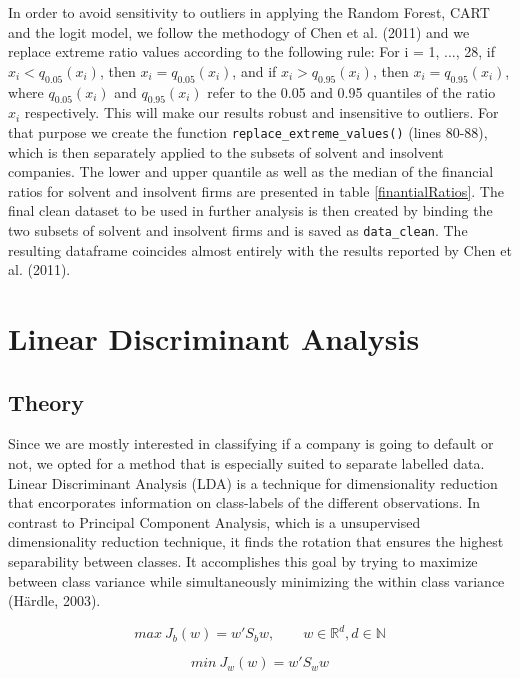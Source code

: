 \documentclass{article}
\begin{document}
 In order to avoid sensitivity to outliers in applying the Random Forest, CART and the logit model, we follow the methodogy of Chen et al. (2011) and we replace extreme ratio values according to the following rule: For i = 1, ..., 28, if $x_i<q_{0.05}(x_i)$, then $x_i=q_{0.05}(x_i)$, and if $x_i>q_{0.95}(x_i)$, then $x_i=q_{0.95}(x_i)$, where $q_{0.05}(x_i)$ and $q_{0.95}(x_i)$ refer to the 0.05 and 0.95 quantiles of the ratio $x_i$ respectively. This will make our results robust and insensitive to outliers. For that purpose we create the function \texttt{replace\_extreme\_values()} (lines 80-88), which is then separately applied to the subsets of solvent and insolvent companies. The lower and upper quantile as well as the median of the financial ratios for solvent and insolvent firms are presented in table \ref{finantialRatios}. The final clean dataset to be used in further analysis is then created by binding the two subsets of solvent and insolvent firms and is saved as \texttt{data\_clean}. The resulting dataframe coincides almost entirely with the results reported by Chen et al. (2011).


\section{Linear Discriminant Analysis}
\subsection{Theory}

Since we are mostly interested in classifying if a company is going to default or not, we opted for a method that is especially suited to separate labelled data. Linear Discriminant Analysis (LDA) is a technique for dimensionality reduction that encorporates information on class-labels of the different observations. In contrast to  Principal Component Analysis, which is a unsupervised dimensionality reduction technique, it finds the rotation that ensures the highest separability between classes. It accomplishes this goal by trying to maximize between class variance while simultaneously minimizing the within class variance (H{\"a}rdle, 2003).

\begin{equation}
max\ J_{b}(w) = w \prime S_{b} w, \qquad w \in \mathbb{R}^d, d \in \mathbb{N}
\end{equation}

\begin{equation}
min\ J_{w}(w) = w \prime S_{w} w
\end{equation}
\end{document}
